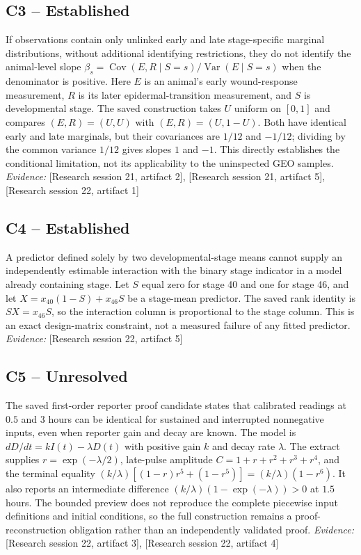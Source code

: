 \documentclass[11pt]{article}
\begin{document}
\begin{sloppypar}
\subsection{C3 -- Established}
If observations contain only unlinked early and late stage-specific marginal distributions, without additional identifying restrictions, they do not identify the animal-level slope $\beta_s=\operatorname{Cov}(E,R\mid S=s)/\operatorname{Var}(E\mid S=s)$ when the denominator is positive.
Here $E$ is an animal's early wound-response measurement, $R$ is its later epidermal-transition measurement, and $S$ is developmental stage. The saved construction takes $U$ uniform on $[0,1]$ and compares $(E,R)=(U,U)$ with $(E,R)=(U,1-U)$. Both have identical early and late marginals, but their covariances are $1/12$ and $-1/12$; dividing by the common variance $1/12$ gives slopes $1$ and $-1$. This directly establishes the conditional limitation, not its applicability to the uninspected GEO samples.
\textit{Evidence: }[Research session 21, artifact 2], [Research session 21, artifact 5], [Research session 22, artifact 1]
\subsection{C4 -- Established}
A predictor defined solely by two developmental-stage means cannot supply an independently estimable interaction with the binary stage indicator in a model already containing stage.
Let $S$ equal zero for stage 40 and one for stage 46, and let $X=x_{40}(1-S)+x_{46}S$ be a stage-mean predictor. The saved rank identity is $SX=x_{46}S$, so the interaction column is proportional to the stage column. This is an exact design-matrix constraint, not a measured failure of any fitted predictor.
\textit{Evidence: }[Research session 22, artifact 5]
\subsection{C5 -- Unresolved}
The saved first-order reporter proof candidate states that calibrated readings at $0.5$ and $3$ hours can be identical for sustained and interrupted nonnegative inputs, even when reporter gain and decay are known.
The model is $dD/dt=kI(t)-\lambda D(t)$ with positive gain $k$ and decay rate $\lambda$. The extract supplies $r=\exp(-\lambda/2)$, late-pulse amplitude $C=1+r+r^2+r^3+r^4$, and the terminal equality $(k/\lambda)[(1-r)r^5+(1-r^5)]=(k/\lambda)(1-r^6)$. It also reports an intermediate difference $(k/\lambda)(1-\exp(-\lambda))>0$ at $1.5$ hours. The bounded preview does not reproduce the complete piecewise input definitions and initial conditions, so the full construction remains a proof-reconstruction obligation rather than an independently validated proof.
\textit{Evidence: }[Research session 22, artifact 3], [Research session 22, artifact 4]

\end{sloppypar}
\end{document}
